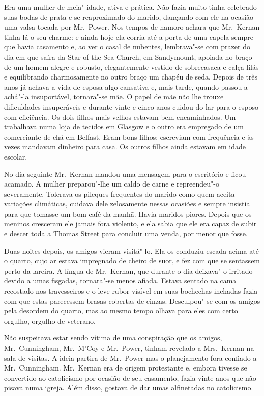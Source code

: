Era uma mulher de meia"-idade, ativa e prática.  Não fazia muito tinha celebrado
suas bodas de prata e se reaproximado do marido, dançando com ele na ocasião
uma valsa tocada por Mr.~Power.  Nos tempos de namoro achara que Mr.~Kernan
tinha lá o seu charme: e ainda hoje ela corria até a porta de uma capela sempre
que havia casamento e, ao ver o casal de nubentes, lembrava"-se com prazer do
dia em que saíra da Star of the Sea Church, em Sandymount, apoiada no braço de
um homem alegre e robusto, elegantemente vestido de sobrecasaca e calça lilás e
equilibrando charmosamente no outro braço um chapéu de seda.  Depois de três
anos já achava a vida de esposa algo cansativa e, mais tarde, quando passou a
achá"-la insuportável, tornara"-se mãe.  O papel de mãe não lhe trouxe
dificuldades insuperáveis e durante vinte e cinco anos cuidou do lar para o
esposo com eficiência.  Os dois filhos mais velhos estavam bem encaminhados.
Um trabalhava numa loja de tecidos em Glasgow e o outro era empregado de um
comerciante de chá em Belfast.  Eram bons filhos; escreviam com frequência e às
vezes mandavam dinheiro para casa.  Os outros filhos ainda estavam em idade
escolar.

No dia seguinte Mr.~Kernan mandou uma mensagem para o escritório e ficou
acamado.  A mulher preparou"-lhe um caldo de carne e repreendeu"-o severamente.
Tolerava os pileques frequentes do marido como quem aceita variações
climáticas, cuidava dele zelosamente nessas ocasiões e sempre insistia para que
tomasse um bom café da manhã.  Havia maridos piores.  Depois que os meninos
cresceram ele jamais fora violento, e ela sabia que ele era capaz de subir e
descer toda a Thomas Street para concluir uma venda, por menor que fosse.

Duas noites depois, os amigos vieram visitá"-lo.  Ela os conduziu escada acima
até o quarto, cujo ar estava impregnado de cheiro de suor, e fez com que se
sentassem perto da lareira.  A língua de Mr.~Kernan, que durante o dia
deixava"-o irritado devido a umas fisgadas, tornara"-se menos afiada.  Estava
sentado na cama recostado nos travesseiros e o leve rubor visível em suas
bochechas inchadas fazia com que estas parecessem brasas cobertas de cinzas.
Desculpou"-se com os amigos pela desordem do quarto, mas ao mesmo tempo olhava
para eles com certo orgulho, orgulho de veterano.

Não suspeitava estar sendo vítima de uma conspiração que os amigos, 
Mr.~Cunningham, Mr.~M’Coy e Mr.~Power, tinham revelado a Mrs.~Kernan na sala de
visitas.  A ideia partira de Mr.~Power mas o planejamento fora confiado a 
Mr.~Cunningham.  Mr.~Kernan era de origem protestante e, embora tivesse se
convertido ao catolicismo por ocasião de seu casamento, fazia vinte anos que
não pisava numa igreja.  Além disso, gostava de dar umas alfinetadas no
catolicismo.


